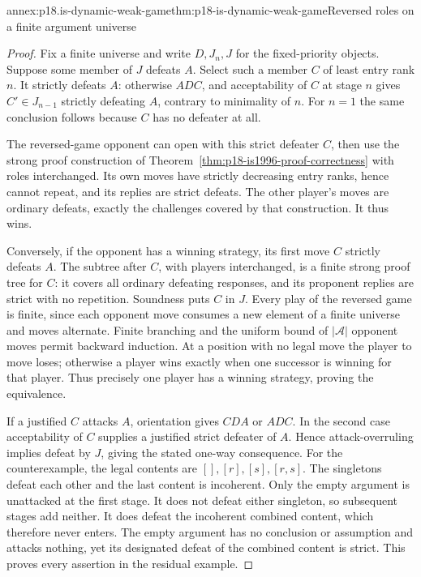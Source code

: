 \begin{annexitem}{annex:p18.is-dynamic-weak-game}{thm:p18-is-dynamic-weak-game}{Reversed roles on a finite argument universe}
\begin{proof}
Fix a finite universe and write \(D,J_n,J\) for the fixed-priority
objects. Suppose some member of \(J\) defeats \(A\). Select such
a member \(C\) of least entry rank \(n\). It strictly defeats
\(A\): otherwise \(A D C\), and acceptability of \(C\) at
stage \(n\) gives \(C'\in J_{n-1}\) strictly defeating \(A\),
contrary to minimality of \(n\).
For \(n=1\) the same conclusion follows because \(C\) has no
defeater at all.

The reversed-game opponent can open with this strict defeater
\(C\), then use the strong proof construction of
Theorem~\ref{thm:p18-is1996-proof-correctness} with roles
interchanged. Its own moves have strictly decreasing entry
ranks, hence cannot repeat, and its replies are strict defeats.
The other player's moves are ordinary defeats, exactly the
challenges covered by that construction. It thus wins.

Conversely, if the opponent has a winning strategy, its first
move \(C\) strictly defeats \(A\). The subtree after \(C\),
with players interchanged, is a finite strong proof tree for
\(C\): it covers all ordinary defeating responses, and its
proponent replies are strict with no repetition. Soundness
puts \(C\) in \(J\).
Every play of the reversed game is finite, since each opponent
move consumes a new element of a finite universe and moves
alternate. Finite branching and the uniform bound of
\(|\mathcal A|\) opponent moves permit backward induction.
At a position with no legal move the player to move loses;
otherwise a player wins exactly when one successor is winning
for that player. Thus precisely one player has a winning strategy,
proving the equivalence.

If a justified \(C\) attacks \(A\), orientation gives \(CDA\)
or \(ADC\). In the second case acceptability of \(C\) supplies
a justified strict defeater of \(A\). Hence attack-overruling
implies defeat by \(J\), giving the stated one-way consequence.
For the counterexample, the legal contents are
\([], [r], [s], [r,s]\). The singletons defeat each other and
the last content is incoherent. Only the empty argument is
unattacked at the first stage. It does not defeat either
singleton, so subsequent stages add neither. It does defeat
the incoherent combined content, which therefore never enters.
The empty argument has no conclusion or assumption and attacks
nothing, yet its designated defeat of the combined content is
strict. This proves every assertion in the residual example.
\end{proof}
\end{annexitem}

